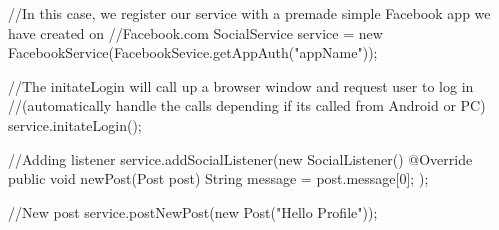 //In this case, we register our service with a premade simple Facebook app we have created on
//Facebook.com
SocialService service = new FacebookService(FacebookSevice.getAppAuth("appName"));

//The initateLogin will call up a browser window and request user to log in
//(automatically handle the calls depending if its called from Android or PC)
service.initateLogin();

//Adding listener
service.addSocialListener(new SocialListener(){
  @Override
   public void newPost(Post post) {
    String message = post.message[0];
   }
});

//New post
service.postNewPost(new Post("Hello Profile"));
